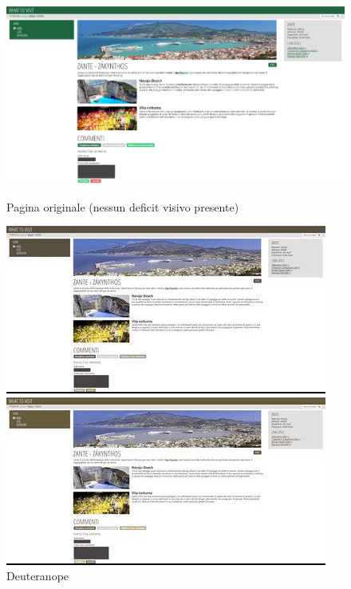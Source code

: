 \begin{figure}[h!]    
\begin{minipage}[t]{0.45\textwidth}
\includegraphics[width=\linewidth]{images/screen/zante.png}
\caption{Pagina originale (nessun deficit visivo presente)}
\end{minipage}
\hspace{\fill}
\begin{minipage}[t]{0.45\textwidth}
\includegraphics[width=\linewidth]{images/screen/deuteranope.jpg}
\caption{Deuteranope}
\end{minipage}
\vspace*{0.5cm}
\begin{minipage}[t]{0.45\textwidth}
\includegraphics[width=\linewidth]{images/screen/protanope.jpg}

\end{minipage}
\end{figure}
